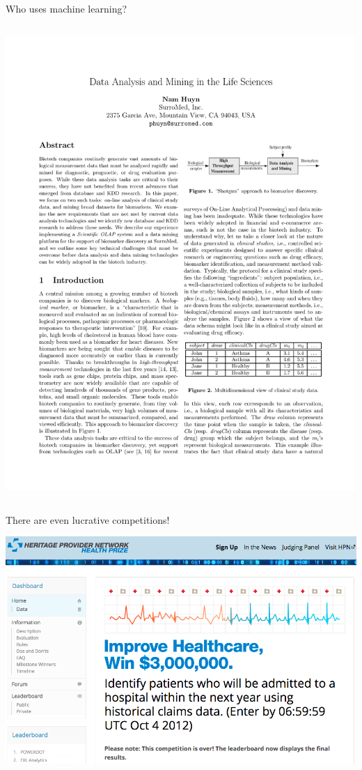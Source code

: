 \documentclass[pdf]{beamer}
\begin{document}
\begin{frame}{Who uses machine learning?}
\begin{columns}
\begin{center}
	\includegraphics[width=\textwidth]{useML04.pdf}
\end{center}
\end{columns}
\end{frame}

\begin{frame}{There are even lucrative competitions!}
\begin{center}
	\includegraphics[width=.9\textwidth]{competition.png}
\end{center}
\end{frame}
\end{document}
